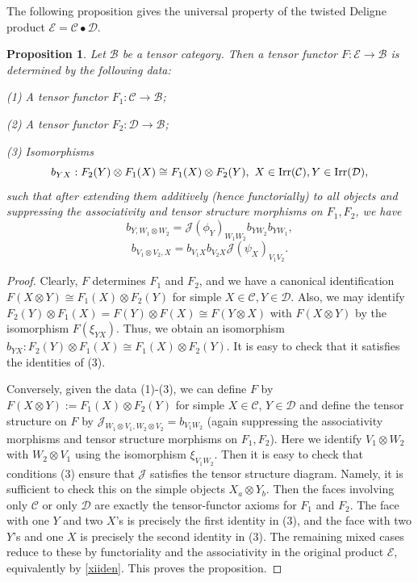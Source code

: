 \documentclass[12pt]{amsart}
\numberwithin{equation}{section}
\newtheorem{proposition}[theorem]{Proposition}
\theoremstyle{definition}
\newcommand{\1}{_{(1)}}
\newcommand{\2}{_{(2)}}
\newcommand{\3}{_{(3)}}
\newcommand{\4}{_{(4)}}
\newcommand{\5}{_{(5)}}
\newcommand{\6}{_{(6)}}
\newcommand{\C}{\mathcal{C}}
\theoremstyle{plain}
\theoremstyle{definition}
\theoremstyle{remark}
\def\C{\mathcal{C}}
\def\D{\mathcal{D}}
\def\E{\mathcal{E}}
\def\B{\mathcal{B}}
\begin{document}
The following proposition gives the universal property of the twisted Deligne product $\E=\C\bullet \D$. 

\begin{proposition}\label{tffromdp} Let $\B$ be a tensor category. Then a tensor functor $F: \E\to \B$ is determined by the following data: 

(1) A tensor functor $F_1: \C\to \B$; 

(2) A tensor functor $F_2: \D\to \B$; 

(3) Isomorphisms 
$$
b_{YX}: F_2(Y)\otimes F_1(X)\cong F_1(X)\otimes F_2(Y),\ X\in {\rm Irr}(\C),Y\in {\rm Irr}(\D),
$$ 
 such that after extending them additively (hence functorially) to all objects and suppressing the associativity and tensor structure morphisms on $F_1,F_2$, we have  
$$
b_{Y,W_1\otimes W_2}=\mathcal J(\phi_Y)_{W_1W_2}b_{YW_2}b_{YW_1},
$$
$$
b_{V_1\otimes V_2,X}=b_{V_1X}b_{V_2X}\mathcal J(\psi_X)_{V_1V_2}.
$$
\end{proposition} 

\begin{proof} Clearly, $F$ determines $F_1$ and $F_2$, and we have 
a canonical identification $F(X\otimes Y)\cong F_1(X)\otimes F_2(Y)$ for simple $X\in \C,Y\in \D$. 
Also, we may identify $F_2(Y)\otimes F_1(X)=F(Y)\otimes F(X)\cong F(Y\otimes X)$ with
$F(X\otimes Y)$ by the isomorphism $F(\xi_{YX})$. Thus, we obtain an isomorphism 
$b_{YX}: F_2(Y)\otimes F_1(X)\cong F_1(X)\otimes F_2(Y)$. 
It is easy to check that it satisfies the identities of (3). 

Conversely, given the data (1)-(3), we can define $F$ by $F(X\otimes Y):=F_1(X)\otimes F_2(Y)$ for simple $X\in \C$, $Y\in \D$ 
and define the tensor structure on $F$ by $\mathcal J_{W_1\otimes V_1,W_2\otimes V_2}=b_{V_1W_2}$ 
(again suppressing the associativity morphisms and tensor structure morphisms on $F_1,F_2$).
Here we identify $V_1\otimes W_2$ with $W_2\otimes V_1$ using the isomorphism $\xi_{V_1W_2}$.  
Then it is easy to check that conditions (3) ensure that $\mathcal J$ satisfies the tensor structure diagram.
Namely, it is sufficient to check this on the simple objects $X_a\otimes Y_b$. Then the faces involving only $\C$ or only $\D$ are exactly the tensor-functor axioms for $F_1$ and $F_2$.  The face with one $Y$ and two $X$'s is precisely the first identity in (3), and the face with two $Y$'s and one $X$ is precisely the second identity in (3).  The remaining mixed cases reduce to these by functoriality and the associativity in the original product $\E$, equivalently by \eqref{xiiden}. 
This proves the proposition.  
\end{proof}
\end{document}
